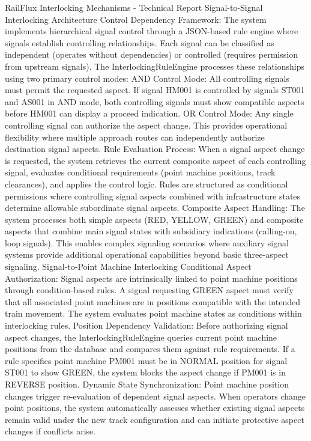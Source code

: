 RailFlux Interlocking Mechanisms - Technical Report
Signal-to-Signal Interlocking Architecture
Control Dependency Framework: The system implements hierarchical signal control through a JSON-based rule engine where signals establish controlling relationships. Each signal can be classified as independent (operates without dependencies) or controlled (requires permission from upstream signals). The InterlockingRuleEngine processes these relationships using two primary control modes:
AND Control Mode: All controlling signals must permit the requested aspect. If signal HM001 is controlled by signals ST001 and AS001 in AND mode, both controlling signals must show compatible aspects before HM001 can display a proceed indication.
OR Control Mode: Any single controlling signal can authorize the aspect change. This provides operational flexibility where multiple approach routes can independently authorize destination signal aspects.
Rule Evaluation Process: When a signal aspect change is requested, the system retrieves the current composite aspect of each controlling signal, evaluates conditional requirements (point machine positions, track clearances), and applies the control logic. Rules are structured as conditional permissions where controlling signal aspects combined with infrastructure states determine allowable subordinate signal aspects.
Composite Aspect Handling: The system processes both simple aspects (RED, YELLOW, GREEN) and composite aspects that combine main signal states with subsidiary indications (calling-on, loop signals). This enables complex signaling scenarios where auxiliary signal systems provide additional operational capabilities beyond basic three-aspect signaling.
Signal-to-Point Machine Interlocking
Conditional Aspect Authorization: Signal aspects are intrinsically linked to point machine positions through condition-based rules. A signal requesting GREEN aspect must verify that all associated point machines are in positions compatible with the intended train movement. The system evaluates point machine states as conditions within interlocking rules.
Position Dependency Validation: Before authorizing signal aspect changes, the InterlockingRuleEngine queries current point machine positions from the database and compares them against rule requirements. If a rule specifies point machine PM001 must be in NORMAL position for signal ST001 to show GREEN, the system blocks the aspect change if PM001 is in REVERSE position.
Dynamic State Synchronization: Point machine position changes trigger re-evaluation of dependent signal aspects. When operators change point positions, the system automatically assesses whether existing signal aspects remain valid under the new track configuration and can initiate protective aspect changes if conflicts arise.
